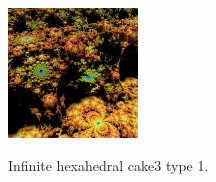 \documentclass[suppldata, dvipdfmx]{interact}
\theoremstyle{plain}%
\theoremstyle{definition}
\theoremstyle{remark}
\theoremstyle{problemstyle}
\begin{document}
\begin{figure}[h!tbp]
\begin{minipage}{0.5\textwidth}
\begin{minipage}[t]{0.24\textwidth}
  \end{minipage}
  \hspace*{\fill}
  \begin{minipage}[t]{0.24\textwidth}
   \centering
   \includegraphics[width=1.35in, height=1.35in,
   keepaspectratio]{./img/sphairahedron/hexahedralCake3/limitsetInf_a.jpg} 
   \label{fig:cake3infiniteLimitsetType1}
  \end{minipage}
  \hspace*{\fill}
  \caption{Infinite hexahedral cake3 type 1.}
  \label{fig:cake3infiniteType1}
 \end{minipage}
\end{figure}
\end{document}
